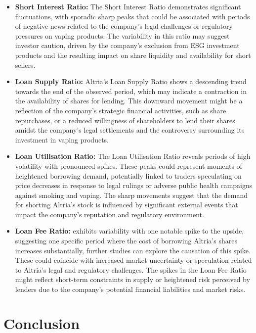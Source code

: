 \begin{itemize}
	\item\textbf{Short Interest Ratio:} The Short Interest Ratio demonstrates significant fluctuations, with sporadic sharp peaks that could be associated with periods of negative news related to the company’s legal challenges or regulatory pressures on vaping products. The variability in this ratio may suggest investor caution, driven by the company's exclusion from ESG investment products and the resulting impact on share liquidity and availability for short sellers.
	\item\textbf{Loan Supply Ratio:} Altria's Loan Supply Ratio shows a descending trend towards the end of the observed period, which may indicate a contraction in the availability of shares for lending. This downward movement might be a reflection of the company's strategic financial activities, such as share repurchases, or a reduced willingness of shareholders to lend their shares amidst the company's legal settlements and the controversy surrounding its investment in vaping products.
	\item\textbf{Loan Utilisation Ratio:} The Loan Utilisation Ratio reveals periods of high volatility with pronounced spikes. These peaks could represent moments of heightened borrowing demand, potentially linked to traders speculating on price decreases in response to legal rulings or adverse public health campaigns against smoking and vaping. The sharp movements suggest that the demand for shorting Altria's stock is influenced by significant external events that impact the company's reputation and regulatory environment.
	\item\textbf{Loan Fee Ratio:} exhibits variability with one notable spike to the upside, suggesting one specific period where the cost of borrowing Altria's shares increases substantially, further studies can explore the causation of this spike. These could coincide with increased market uncertainty or speculation related to Altria’s legal and regulatory challenges. The spikes in the Loan Fee Ratio might reflect short-term constraints in supply or heightened risk perceived by lenders due to the company's potential financial liabilities and market risks.
\end{itemize}



\doublespacing
\section{Conclusion}




